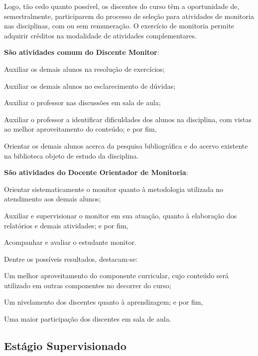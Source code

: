 \documentclass[
	12pt,				%
	openright,			%
	twoside,			%
	a4paper,			%
	chapter=TITLE,		%
	english,			%
	french,				%
	spanish,			%
	brazil,				%
	]{abntex2}
\begin{document}
Logo, tão cedo quanto possível,  os discentes do curso têm a oportunidade de, semestralmente, participarem do processo de seleção para atividades de monitoria nas disciplinas, com ou sem remuneração. O exercício de monitoria permite adquirir créditos na modalidade de atividades complementares.


\textbf{São atividades comum do Discente Monitor}:
\begin{alineas}
\item Auxiliar os demais alunos na resolução de exercícios;
\item Auxiliar os demais alunos no esclarecimento de dúvidas;
\item Auxiliar o professor nas discussões em sala de aula;
\item Auxiliar o professor a identificar dificuldades dos alunos na disciplina, com vistas ao melhor aproveitamento do conteúdo; e por fim,
\item Orientar os demais alunos acerca da pesquisa bibliográfica e do acervo existente na biblioteca objeto de estudo da disciplina.

\end{alineas}


\textbf{São atividades do Docente Orientador de Monitoria}:
\begin{alineas}
\item Orientar sistematicamente o monitor quanto à metodologia utilizada no atendimento aos demais alunos;
\item Auxiliar e supervisionar o monitor em sua atuação, quanto à elaboração dos relatórios e demais atividades; e por fim,
\item Acompanhar e avaliar o estudante monitor.
\end{alineas}

Dentre os possíveis resultados, destacam-se: 
\begin{alineas}
\item Um melhor aproveitamento do componente curricular, cujo conteúdo será utilizado em outras componentes no decorrer do curso;
\item Um nivelamento dos discentes quanto à aprendizagem; e por fim,
\item Uma maior participação dos discentes em sala de aula.
\end{alineas}



\subsection{Estágio Supervisionado}
\end{document}
